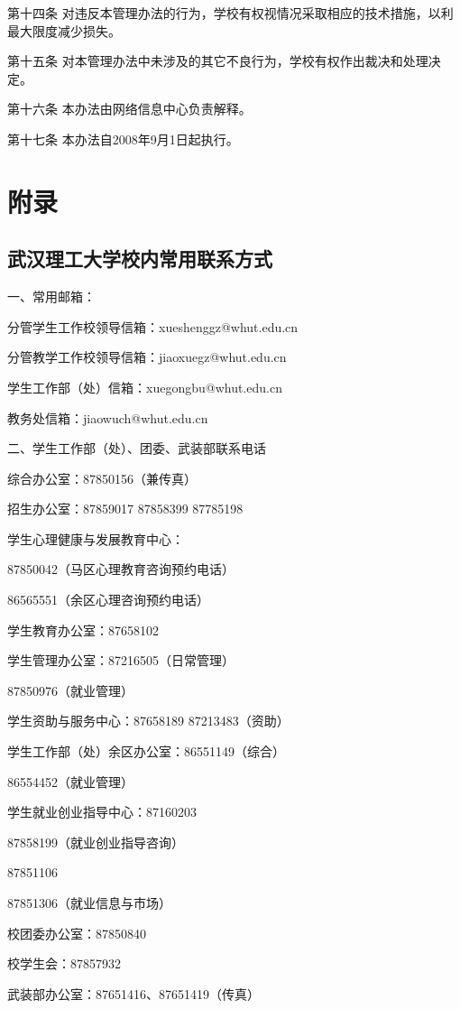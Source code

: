 \documentclass[UTF8,12pt,a4paper]{report}
\begin{document}
第十四条 对违反本管理办法的行为，学校有权视情况采取相应的技术措施，以利最大限度减少损失。

第十五条 对本管理办法中未涉及的其它不良行为，学校有权作出裁决和处理决定。

第十六条 本办法由网络信息中心负责解释。

第十七条 本办法自2008年9月1日起执行。

\part{附录}
\chapter{武汉理工大学校内常用联系方式}
一、常用邮箱：

分管学生工作校领导信箱：xueshenggz@whut.edu.cn

分管教学工作校领导信箱：jiaoxuegz@whut.edu.cn

学生工作部（处）信箱：xuegongbu@whut.edu.cn

教务处信箱：jiaowuch@whut.edu.cn



二、学生工作部（处）、团委、武装部联系电话

综合办公室：87850156（兼传真）

招生办公室：87859017 87858399 87785198

学生心理健康与发展教育中心：

87850042（马区心理教育咨询预约电话）

86565551（余区心理咨询预约电话）

学生教育办公室：87658102

学生管理办公室：87216505（日常管理）

87850976（就业管理）

学生资助与服务中心：87658189 87213483（资助）

学生工作部（处）余区办公室：86551149（综合）

86554452（就业管理）

学生就业创业指导中心：87160203

87858199（就业创业指导咨询）

87851106

87851306（就业信息与市场）

校团委办公室：87850840

校学生会：87857932

武装部办公室：87651416、87651419（传真）
\end{document}
